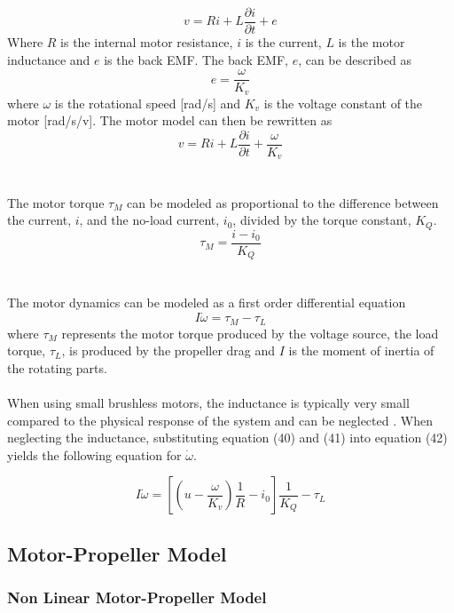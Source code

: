 \begin{equation}
    v = Ri + L\frac{\partial i}{\partial t} + e
\end{equation} 
Where $R$ is the internal motor resistance, $i$ is the current, $L$ is the motor inductance and $e$ is the back EMF. The back EMF, $e$, can be described as
\begin{equation}
    e = \frac{\omega}{K_v}
\end{equation}
where $\omega$ is the rotational speed [rad/s] and $K_v$ is the voltage constant of the motor [rad/s/v]. The motor model can then be rewritten as
\begin{equation}
    v = Ri + L\frac{\partial i}{\partial t} + \frac{\omega}{K_v}
\end{equation}
\\\\
The motor torque $\tau_M$ can be modeled as proportional to the difference between the current, $i$, and the no-load current, $i_0$, divided by the torque constant, $K_Q$.  
\begin{equation}
    \tau_M = \frac{i - i_0}{K_Q}
\end{equation}
\\\\
The motor dynamics can be modeled as a first order differential equation
\begin{equation}
    I\dot{\omega} = \tau_M - \tau_L
\end{equation}
where $\tau_M$ represents the motor torque produced by the voltage source, the load torque, $\tau_L$, is produced by the propeller drag and $I$ is the moment of inertia of the rotating parts. 
\\\\
When using small brushless motors, the inductance is typically very small compared to the physical response of the system and can be neglected \cite{MITvpp}. When neglecting the inductance, substituting equation (40) and (41) into equation (42) yields the following equation for $\dot\omega$.

\begin{equation}
    I\dot{\omega} =\left[\left(u-\frac{\omega}{K_v}\right)\frac{1}{R}-i_0\right]\frac{1}{K_Q} - \tau_L
\end{equation}
\newpage

\subsection{Motor-Propeller Model}
\subsubsection{Non Linear Motor-Propeller Model}

